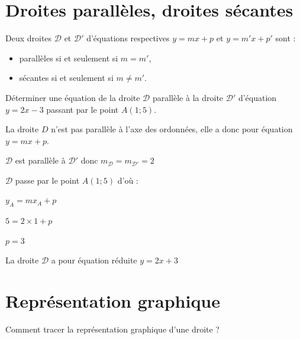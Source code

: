 \section{Droites parallèles, droites sécantes}

\begin{prop}{}{}
  Deux droites $\mathcal{D}$ et $\mathcal{D'}$ d'équations respectives $y=mx+p$ et $y=m'x+p'$ sont :
  \begin{itemize}
     \item  parallèles si et seulement si $m=m'$,
     \item  sécantes si et seulement si $m\neq m'$.
  \end{itemize}
\end{prop}

\begin{ex}{}{}
Déterminer une équation de la droite $\mathcal{D}$ parallèle à la droite $\mathcal{D'}$ d'équation $y=2x-3$ passant par le point $A(1;5)$.

\medskip
\noindent La droite $D$ n'est pas parallèle à l'axe des ordonnées, elle a donc pour équation $y=mx+p$.

\medskip
\noindent $\mathcal{D}$ est parallèle à $\mathcal{D}'$ donc $m_{\mathcal{D}}=m_{\mathcal{D}'}=2$

\medskip
\noindent $\mathcal{D}$ passe par le point $A(1;5)$ d'où :

\medskip
\hspace*{0.2cm} $y_A=mx_A+p$
              
\hspace*{0.2cm} $5=2\times 1+p$
              
\hspace*{0.2cm} $p=3$

\medskip
\noindent La droite $\mathcal{D}$ a pour équation réduite $y=2x+3$ 
\end{ex}

\section{Représentation graphique}

Comment tracer la représentation graphique d'une droite ?


